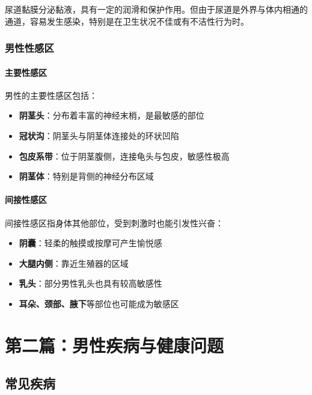 尿道黏膜分泌黏液，具有一定的润滑和保护作用。但由于尿道是外界与体内相通的通道，容易发生感染，特别是在卫生状况不佳或有不洁性行为时。

\section{男性性感区}
\subsection{主要性感区}

男性的主要性感区包括：

\begin{itemize}
    \item \textbf{阴茎头}：分布着丰富的神经末梢，是最敏感的部位
    \item \textbf{冠状沟}：阴茎头与阴茎体连接处的环状凹陷
    \item \textbf{包皮系带}：位于阴茎腹侧，连接龟头与包皮，敏感性极高
    \item \textbf{阴茎体}：特别是背侧的神经分布区域
\end{itemize}

\subsection{间接性感区}

间接性感区指身体其他部位，受到刺激时也能引发性兴奋：

\begin{itemize}
    \item \textbf{阴囊}：轻柔的触摸或按摩可产生愉悦感
    \item \textbf{大腿内侧}：靠近生殖器的区域
    \item \textbf{乳头}：部分男性乳头也具有较高敏感性
    \item \textbf{耳朵、颈部、腋下}等部位也可能成为敏感区
\end{itemize}

\part{第二篇：男性疾病与健康问题}

\chapter{常见疾病}

